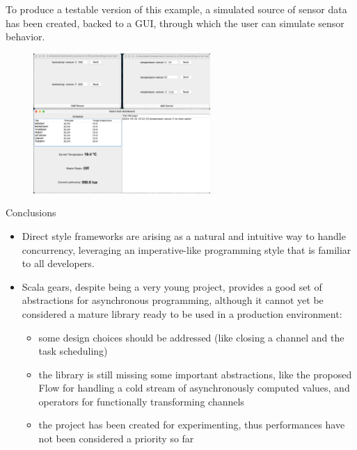 \documentclass[aspectratio=1610,xcolor=dvipsnames]{beamer}
\begin{document}
\begin{frame}
  \small
  To produce a testable version of this example, a simulated source of sensor data has been created, backed to a GUI, through which the user can simulate sensor behavior.
  \begin{figure}
      \centering
      \includegraphics[width=0.6\textwidth]{./images/smart-hub.png}
  \end{figure}
\end{frame}
%
\begin{frame}{Conclusions}
  \begin{itemize}
      \item Direct style frameworks are arising as a natural and intuitive way to handle concurrency, leveraging an imperative-like programming style that is familiar to all developers.
      \item Scala gears, despite being a very young project, provides a good set of abstractions for asynchronous programming, although it cannot yet be considered a mature library ready to be used in a production environment:
      \begin{itemize}
          \item some design choices should be addressed (like closing a channel and the task scheduling)
          \item the library is still missing some important abstractions, like the proposed Flow for handling a cold stream of asynchronously computed values, and operators for functionally transforming channels
          \item  the project has been created for experimenting, thus performances have not been considered a priority so far
      \end{itemize}
  \end{itemize}
\end{frame}
%
\end{document}
